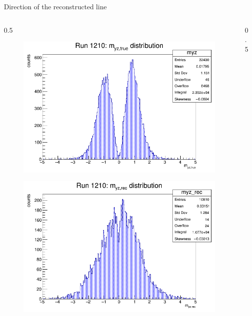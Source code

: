 \documentclass{beamer}[10pt]
\begin{document}
\begin{frame}{Direction of the reconstructed line}
  \vspace{-3mm}

  \begin{columns}
    \begin{column}{0.5\framewidth}
  \begin{figure}[H]
    \centering
    \includegraphics[width= \textwidth]{figures/pdf/myz.png}
    \label{fig:enter-label}
\end{figure}
\vspace{-12mm}
\begin{figure}[H]
  \centering
  \includegraphics[width= \textwidth]{figures/pdf/myz_rec.png}
  \label{fig:enter-label}
\end{figure}

\end{column}
\begin{column}{0.5\framewidth}


\end{column}
\end{columns}
\end{frame}
\end{document}
